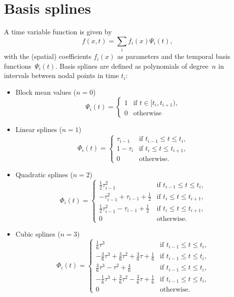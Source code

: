 \section{Basis splines}\label{fundamentals.basisSplines}
A time variable function is given by
\begin{equation}
f(x,t) =  \sum_i f_i(x)\Psi_i(t),
\end{equation}
with the (spatial) coefficients $f_i(x)$ as parameters and the temporal basis functions~$\Psi_i(t)$.
Basis splines are defined as polynomials of degree~$n$ in intervals between nodal points in time $t_i$:
\begin{itemize}
\item Block mean values ($n=0$)
\begin{equation}
  \Psi_i(t) = \begin{cases}
  1 & \text{if } t\in[t_i,t_{i+1}), \\
  0 & \text{otherwise}
\end{cases}
\end{equation}
\item Linear splines ($n=1$)
\begin{equation}
  \Phi_i(t) = \begin{cases}
  \tau_{i-1}   & \text{if } t_{i-1}\le t \le t_i, \\
  1-\tau_i     & \text{if } t_{i}\le t \le t_{i+1}, \\
  0 & \text{otherwise}.
\end{cases}
\end{equation}
\item Quadratic splines ($n=2$)
\begin{equation}
  \Phi_i(t) = \begin{cases}
  \frac{1}{2}\tau^2_{i-1}   & \text{if } t_{i-1}\le t \le t_i, \\
  -\tau^2_{i-1}+\tau_{i-1}+\frac{1}{2}     & \text{if } t_{i}\le t \le t_{i+1}, \\
  \frac{1}{2}\tau^2_{i-1}-\tau_{i-1}+\frac{1}{2}     & \text{if } t_{i}\le t \le t_{i+1}, \\
  0 & \text{otherwise}.
\end{cases}
\end{equation}
\item Cubic splines ($n=3$)
\begin{equation}
  \Phi_i(t) = \begin{cases}
   \frac{1}{6}\tau^3                                                        & \text{if } t_{i-1}\le t \le t_i, \\
  -\frac{3}{6}\tau^3 +\frac{3}{6}\tau^2 +\frac{3}{6}\tau  +\frac{1}{6} & \text{if } t_{i-1}\le t \le t_i, \\
   \frac{3}{6}\tau^3 -            \tau^2                     +\frac{4}{6} & \text{if } t_{i-1}\le t \le t_i, \\
  -\frac{1}{6}\tau^3 +\frac{3}{6}\tau^2 -\frac{3}{6}\tau  +\frac{1}{6} & \text{if } t_{i-1}\le t \le t_i, \\
  0 & \text{otherwise}.
\end{cases}
\end{equation}
\end{itemize}
